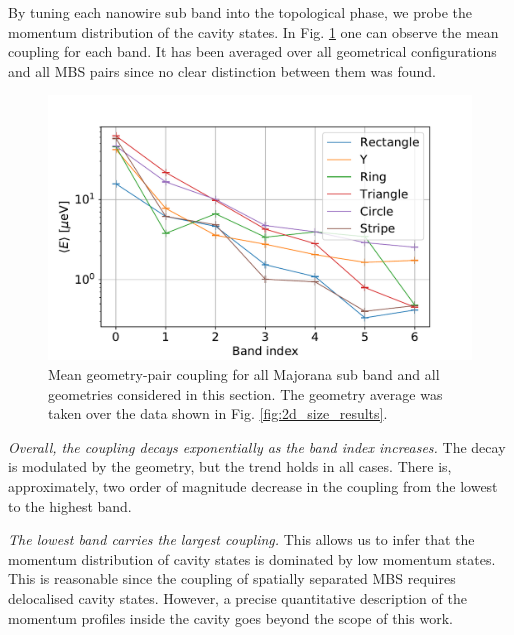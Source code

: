 By tuning each nanowire sub band into the topological phase, we probe the momentum distribution of the cavity states.
In Fig. \ref{fig:sub_bands} one can observe the mean coupling for each band.
It has been averaged over all geometrical configurations and all MBS pairs since no clear distinction between them was found.

\begin{figure}[h!]
\centering
  \includegraphics[width=0.6\linewidth]{figures/sub_bands_results.pdf}
  \caption{Mean geometry-pair coupling for all Majorana sub band and all geometries considered in this section. The geometry average was taken over the data shown in Fig. \ref{fig:2d_size_results}.}
  \label{fig:sub_bands}
\end{figure}

\textit{Overall, the coupling decays exponentially as the band index increases.}
The decay is modulated by the geometry, but the trend holds in all cases.
There is, approximately, two order of magnitude decrease in the coupling from the lowest to the highest band.

\textit{The lowest band carries the largest coupling.}
This allows us to infer that the momentum distribution of cavity states is dominated by low momentum states.
This is reasonable since the coupling of spatially separated MBS requires delocalised cavity states.
However, a precise quantitative description of the momentum profiles inside the cavity goes beyond the scope of this work.